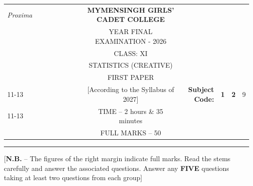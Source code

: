 \documentclass[12pt]{article}
\begin{document}
\begin{table}[]
\begin{tabular}{llllllllcllcl}
\textit{Proxima} &  &  &  &  &  &  &  & \textbf{MYMENSINGH GIRLS’ CADET COLLEGE} &                                             &                                 & \multicolumn{1}{l}{}            &                        \\
                 &  &  &  &  &  &  &  & YEAR FINAL EXAMINATION - 2026          &                                             &                                 &                                 &                        \\
                 &  &  &  &  &  &  &  & CLASS: XI                               &                                             &                                 &                                 &                        \\
                 &  &  &  &  &  &  &  & STATISTICS (CREATIVE)                    &                                             &                                 &                                 &                        \\
                 &  &  &  &  &  &  &  & FIRST PAPER                             &                                             &                                 & \multicolumn{1}{r}{}            &                        \\ \cline{11-13} 
                 &  &  &  &  &  &  &  & [According to the Syllabus of 2027]      & \multicolumn{1}{r|}{\textbf{Subject Code:}} & \multicolumn{1}{l|}{\textbf{1}} & \multicolumn{1}{l|}{\textbf{2}} & \multicolumn{1}{l|}{9} \\ \cline{11-13} 
                 &  &  &  &  &  &  &  & TIME – 2 hours \& 35 minutes             &                                             &                                 & \multicolumn{1}{r}{}            &                        \\
                 &  &  &  &  &  &  &  & FULL MARKS – 50                          &                       
\end{tabular}
\end{table}

\vspace{-1cm}
\hrule

\begin{center}
[\textbf{N.B.} – The figures of the right margin indicate full marks. Read the stems carefully and answer the associated questions. Answer any \textbf{FIVE} questions taking at least two questions from each group]\\
\end{center}
\end{document}
